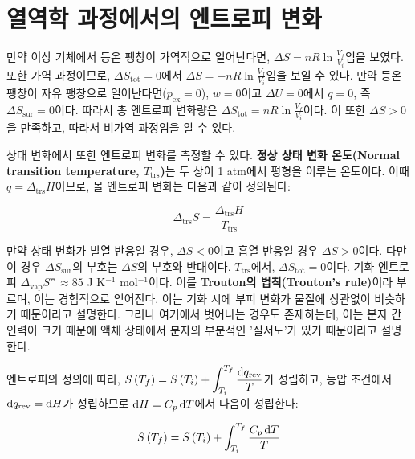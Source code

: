     \section{열역학 과정에서의 엔트로피 변화}
        \hspace{\parindent} 만약 이상 기체에서 등온 팽창이 가역적으로 일어난다면, $\displaystyle\Delta S = nR \ln{\frac{V_f}{V_i}}$임을 보였다. 또한 가역 과정이므로, $\Delta S_\mathrm{tot} = 0$에서 
        $\displaystyle\Delta S = -nR \ln{\frac{V_f}{V_i}}$임을 보일 수 있다. 만약 등온 팽창이 자유 팽창으로 일어난다면($p_\mathrm{ex} = 0$), $w=0$이고 $\Delta U = 0$에서 
        $q=0$, 즉 $\Delta S_\mathrm{sur} = 0$이다. 따라서 총 엔트로피 변화량은 $\displaystyle\Delta S_\mathrm{tot} = nR \ln{\frac{V_f}{V_i}}$이다. 
        이 또한 $\Delta S > 0$을 만족하고, 따라서 비가역 과정임을 알 수 있다.
        \par 상태 변화에서 또한 엔트로피 변화를 측정할 수 있다. \textbf{정상 상태 변화 온도(Normal transition temperature, $T_\mathrm{trs}$)}는 두 상이 1 atm에서 
        평형을 이루는 온도이다. 이때 $q = \Delta_{\mathrm{trs}}H$이므로, 몰 엔트로피 변화는 다음과 같이 정의된다: 
        \begin{defn}\label{trsentr}
        \begin{equation*}
            \Delta_{\mathrm{trs}}S = \frac{\Delta_\mathrm{trs}H}{T_\mathrm{trs}}
        \end{equation*}
        \end{defn}
        만약 상태 변화가 발열 반응일 경우, $\Delta S < 0$이고 흡열 반응일 경우 $\Delta S > 0$이다. 다만 이 경우 $\Delta S_\mathrm{sur}$의 부호는 $\Delta S$의 부호와 
        반대이다. $T_\mathrm{trs}$에서, $\Delta S_\mathrm{tot} = 0$이다. 기화 엔트로피 $\Delta_\mathrm{vap}S^{\circlehbar} \approx 85$ J K$^{-1}$ mol$^{-1}$이다. 
        이를 \textbf{Trouton의 법칙(Trouton's rule)}이라 부르며, 이는 경험적으로 얻어진다. 이는 기화 시에 부피 변화가 물질에 상관없이 비슷하기 때문이라고 설명한다. 
        그러나 여기에서 벗어나는 경우도 존재하는데, 이는 분자 간 인력이 크기 때문에 액체 상태에서 분자의 부분적인 '질서도'가 있기 때문이라고 설명한다.
        \par 엔트로피의 정의에 따라, $\displaystyle S\left(T_f\right) = S\left(T_i\right) + \int_{T_i}^{T_f}\frac{\operatorname{d\!} q_\mathrm{rev}}{T}$가 성립하고, 등압 조건에서 
        $\operatorname{d\!} q_\mathrm{rev} = \operatorname{d\!} H$가 성립하므로 $\operatorname{d\!} H = C_p \operatorname{d\!} T$에서 다음이 성립한다:
        \begin{cor}\label{entisobar}
        \begin{equation*}
            S\left(T_f\right) = S\left(T_i\right)+\int_{T_i}^{T_f}\frac{C_p\operatorname{d\!} T}{T}
        \end{equation*}
        \end{cor}
